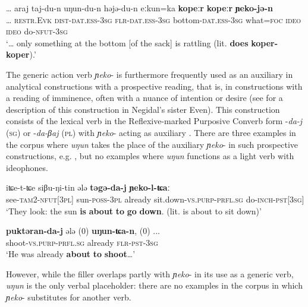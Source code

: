 \documentclass[output=paper]{langscibook}
\begin{document}
\ea \label{ex:pakendorf:40}
\gll … araj taj-du-n uŋun-du-n həjə-du-n eːkun=ka \textbf{kopeːr} \textbf{kopeːr} \textbf{ɲeko-jə-n}\\
     … \textsc{restr.Evk} \textsc{dist-dat.ess-3sg} \textsc{flr-dat.ess-3sg} bottom-\textsc{dat.ess}{}-\textsc{3sg} what=\textsc{foc} \textsc{ideo} \textsc{ideo} do-\textsc{nfut-3sg}\\
\glt ‘… only something at the bottom [of the sack] is rattling (lit. \textbf{does} \textbf{koper-koper}).’ 
\z

The generic action verb \textit{ɲeko}- is furthermore frequently used as an auxiliary in analytical constructions with a prospective reading, that is, in constructions with a reading of imminence, often with a nuance of intention or desire (see \citealt{Matić2017} for a description of this construction in Negidal’s sister Even). This construction consists of the lexical verb in the Reflexive-marked Purposive Converb form -\textit{da-j} (\textsc{sg}) or -\textit{da-βaj} (\textsc{pl}) with \textit{ɲeko}- acting as auxiliary . There are three examples in the corpus where \textit{uŋun} takes the place of the auxiliary \textit{ɲeko}- in such prospective constructions, e.g. , but no examples where \textit{uŋun} functions as a light verb with ideophones. 


\ea \label{ex:pakendorf:41}
\gll iʨe-t-ʨe siβu-ŋi-tin ələ \textbf{təgə-da-j} \textbf{ɲeko-l-ʨaː}\\
     see-\textsc{tam2-nfut[3pl]} sun-\textsc{poss-3pl} already sit.down-\textsc{vs.purp}{}-\textsc{prfl.sg} do-\textsc{inch-pst[3sg]}\\
\glt ‘They look: the sun \textbf{is} \textbf{about} \textbf{to} \textbf{go} \textbf{down}. (lit. is about to sit down)’ 
\z

\ea \label{ex:pakendorf:42}
\gll \textbf{puktəran-da-j}
	ələ
	\textup{(0)}
	\textbf{uŋun-ʨa-n}, 
	\textup{(0)} 
	...\\
    shoot-\textsc{vs.purp-prfl.sg}
    already
    {}
    \textsc{flr-pst-3sg}
    {}
    {}\\
\glt ‘He was already \textbf{about} \textbf{to} \textbf{shoot}…’ 
\z

However, while the filler overlaps partly with \textit{ɲeko}{}- in its use as a generic verb, \textit{uŋun} is the only verbal placeholder: there are no examples in the corpus in which \textit{ɲeko}{}- substitutes for another verb.  
\end{document}
